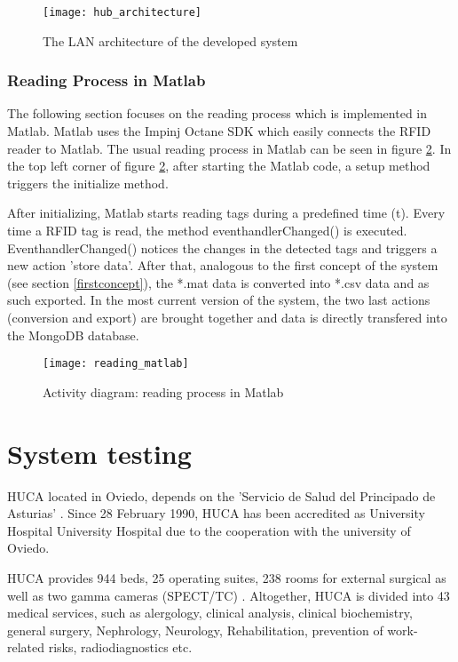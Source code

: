 \begin{figure}
\centering
\texttt{[image: hub\_architecture]} 
\caption{\label{fig:hub_architecture}The LAN architecture of the developed system} 
\end{figure}

\subsubsection{Reading Process in Matlab}

The following section focuses on the reading process which is implemented in Matlab. Matlab uses the Impinj Octane SDK \cite{octanesdk} which easily connects the RFID reader to Matlab. The usual reading process in Matlab can be seen in figure \ref{fig:reading_matlab}. In the top left corner of figure \ref{fig:reading_matlab}, after starting the Matlab code, a setup method triggers the initialize method. 

After initializing, Matlab starts reading tags during a predefined time (t). Every time a RFID tag is read, the method eventhandlerChanged() is executed. EventhandlerChanged() notices the changes in the detected tags and triggers a new action 'store data'. After that, analogous to the first concept of the system (see section \ref{firstconcept}), the *.mat data is converted into *.csv data and as such exported. In the most current version of the system, the two last actions (conversion and export) are brought together and data is directly transfered into the MongoDB database. 

\begin{figure}
\centering
\texttt{[image: reading\_matlab]} 
\caption{\label{fig:reading_matlab}Activity diagram: reading process in Matlab} 
\end{figure}

\section{System testing}\label{tests}

\ac{HUCA} located in Oviedo, depends on the 'Servicio de Salud del Principado de Asturias' \cite{huca}. Since 28 February 1990, HUCA has been accredited as University Hospital University Hospital due to the cooperation with the university of Oviedo.

HUCA provides 944 beds, 25 operating suites, 238 rooms for external surgical as well as two gamma cameras (\ac{SPECT}/\ac{TC}) \cite{huca}. Altogether, HUCA is divided into 43 medical services, such as alergology, clinical analysis, clinical biochemistry, general surgery, Nephrology, Neurology, Rehabilitation, prevention of work-related risks, radiodiagnostics etc. 

